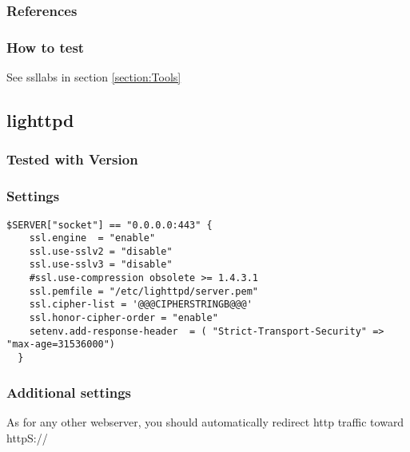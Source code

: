 \subsubsection{References}

\subsubsection{How to test}

See ssllabs in section \ref{section:Tools}



\subsection{lighttpd}



\subsubsection{Tested with Version}


\subsubsection{Settings}



\begin{lstlisting}[breaklines]
  $SERVER["socket"] == "0.0.0.0:443" {
    ssl.engine  = "enable"
    ssl.use-sslv2 = "disable"
    ssl.use-sslv3 = "disable"
    #ssl.use-compression obsolete >= 1.4.3.1
    ssl.pemfile = "/etc/lighttpd/server.pem"
    ssl.cipher-list = '@@@CIPHERSTRINGB@@@'
    ssl.honor-cipher-order = "enable"
    setenv.add-response-header  = ( "Strict-Transport-Security" => "max-age=31536000")
  }
\end{lstlisting}


\subsubsection{Additional settings}

As for any other webserver, you should automatically redirect http traffic toward httpS://

